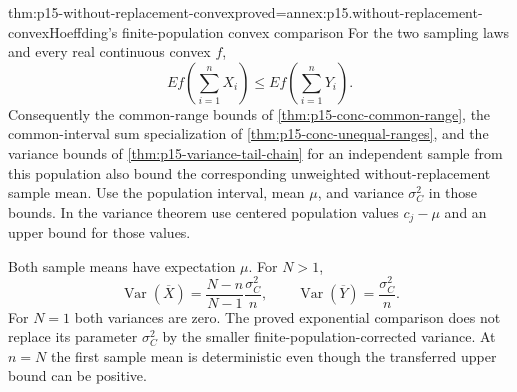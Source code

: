 \begin{hbtheorem}{thm:p15-without-replacement-convex}{proved=annex:p15.without-replacement-convex}{Hoeffding's finite-population convex comparison}
For the two sampling laws and every real continuous convex \(f\),
\[
 E f\!\left(\sum_{i=1}^nX_i\right)
 \leq E f\!\left(\sum_{i=1}^nY_i\right).
\]
Consequently the common-range bounds of
\cref{thm:p15-conc-common-range}, the common-interval sum specialization of
\cref{thm:p15-conc-unequal-ranges}, and the variance bounds of
\cref{thm:p15-variance-tail-chain} for an independent sample from this
population also bound the corresponding unweighted without-replacement
sample mean.
Use the population interval, mean \(\mu\), and variance \(\sigma_C^2\)
in those bounds. In the variance theorem use centered population values
\(c_j-\mu\) and an upper bound for those values.

Both sample means have expectation \(\mu\). For \(N>1\),
\[
 \operatorname{Var}(\overline X)
 =\frac{N-n}{N-1}\frac{\sigma_C^2}{n},\qquad
 \operatorname{Var}(\overline Y)=\frac{\sigma_C^2}{n}.
\]
For \(N=1\) both variances are zero. The proved exponential comparison
does not replace its parameter \(\sigma_C^2\) by the smaller
finite-population-corrected variance. At \(n=N\) the first sample mean is
deterministic even though the transferred upper bound can be positive.
\end{hbtheorem}

